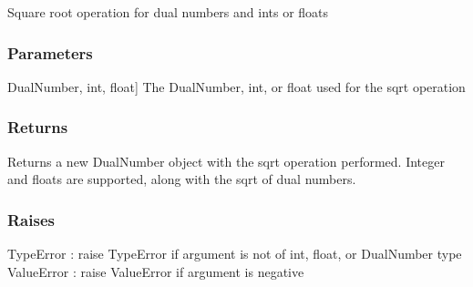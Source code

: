 \documentclass[letterpaper,10pt,english]{sphinxmanual}
\begin{document}
\begin{fulllineitems}
\label{\detokenize{autodiff:autodiff.operators.sqrt}}
\pysigstartsignatures
{}
\pysigstopsignatures
\sphinxAtStartPar
Square root operation for dual numbers and ints or floats


\subsubsection{Parameters}
\label{\detokenize{autodiff:id39}}\begin{description}
\sphinxlineitem{x}{[}DualNumber, int, float{]}
\sphinxAtStartPar
The DualNumber, int, or float used for the sqrt operation

\end{description}


\subsubsection{Returns}
\label{\detokenize{autodiff:id40}}\begin{description}
\sphinxAtStartPar
Returns a new DualNumber object with the sqrt operation performed. Integer and
floats are supported, along with the sqrt of dual numbers.

\end{description}


\subsubsection{Raises}
\label{\detokenize{autodiff:id41}}
\sphinxAtStartPar
TypeError : raise TypeError if argument is not of int, float, or DualNumber type
ValueError : raise ValueError if argument is negative

\end{fulllineitems}

\end{document}
